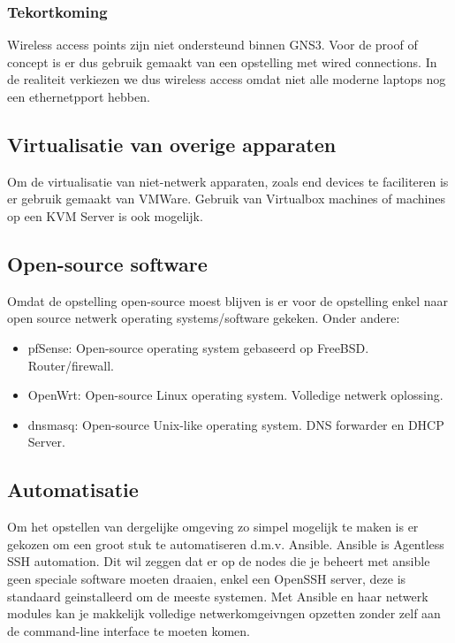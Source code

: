 \subsubsection{Tekortkoming}
Wireless access points zijn niet ondersteund binnen GNS3. Voor de proof of concept is er dus gebruik gemaakt van een opstelling met wired connections. In de realiteit verkiezen we dus wireless access omdat niet alle moderne laptops nog een ethernetpport hebben.   

\subsection{Virtualisatie van overige apparaten}
Om de virtualisatie van niet-netwerk apparaten, zoals end devices te faciliteren is er gebruik gemaakt van VMWare. Gebruik van Virtualbox machines of machines op een KVM Server is ook mogelijk. 


\subsection{Open-source software}
Omdat de opstelling open-source moest blijven is er voor de opstelling enkel naar open source netwerk operating systems/software gekeken. Onder andere:
\begin{itemize}	
	\item pfSense: Open-source operating system gebaseerd op FreeBSD. Router/firewall.
	\item OpenWrt: Open-source Linux operating system. Volledige netwerk oplossing. 
	\item dnsmasq: Open-source Unix-like operating system. DNS forwarder en DHCP Server.
\end{itemize}


\subsection{Automatisatie}

Om het opstellen van dergelijke omgeving zo simpel mogelijk te maken is er gekozen om een groot stuk te automatiseren d.m.v. Ansible. Ansible is Agentless SSH automation. Dit wil zeggen dat er op de nodes die je beheert met ansible geen speciale software moeten draaien, enkel een OpenSSH server, deze is standaard geinstalleerd om de meeste systemen. Met Ansible en haar netwerk modules kan je makkelijk volledige netwerkomgeivngen opzetten zonder zelf aan de command-line interface te moeten komen. 

